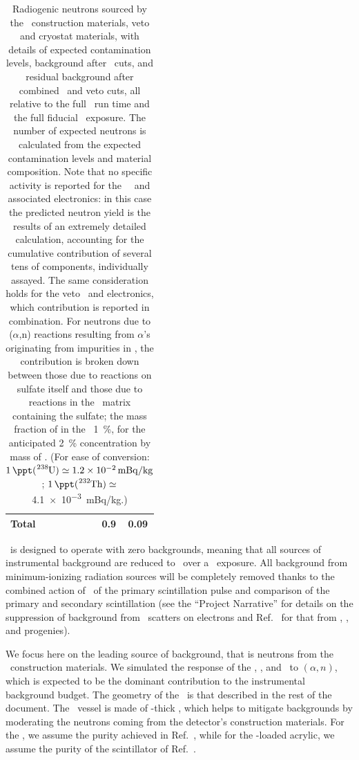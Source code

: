 \begin{table}[t]
\begin{tabular}{lccccccc}
\hline
{\bf Total}								&				&				&				&				&				&\num[math-rm=\mathbf]{0.9}
																																		&\num[math-rm=\mathbf]{0.09}\\ 
\hline
\end{tabular}
\caption[Radiogenic neutrons from detector materials and background before and after cuts.]{Radiogenic neutrons sourced by the \LArTPC\ construction materials, veto and cryostat materials, with details of expected contamination levels, background after \TPC\ cuts, and residual background after combined \TPC\ and veto cuts, all relative to the full \DSkExtendedRunTimePlanned\ run time and the full fiducial \DSkExtendedExposure\ exposure.  The number of expected neutrons is calculated from the expected contamination levels and material composition.  Note that no specific activity is reported for the \TPC\ \SiPMs\ and associated electronics: in this case the predicted neutron yield is the results of an extremely detailed calculation, accounting for the cumulative contribution of several tens of components, individually assayed.  The same consideration holds for the veto \SiPMs\ and electronics, which contribution is reported in combination.  For neutrons due to ($\alpha$,n) reactions resulting from $\alpha$'s originating from impurities in , the contribution is broken down between those due to reactions on  sulfate itself and those due to reactions in the \PMMA\ matrix containing the  sulfate; the mass fraction of  in the \GdAS\ \SI{1}{\percent}, for the anticipated \SI{2}{\percent} concentration by mass of .  (For ease of conversion: $\SI{1}{\ppt}(\ce{^238U}) \simeq \SI{1.2e-2}{mBq/kg}$; $\SI{1}{\ppt}(\ce{^232Th}) \simeq$ \SI{4.1e-3}{mBq/kg}.)}
\label{tab:NeutronBackground}
\end{table}

\DSks\ is designed to operate with zero backgrounds, meaning that all sources of instrumental background are reduced to \BackgroundFreeRequirement\ over a \DSkExtendedExposure\ exposure.  All background from minimum-ionizing radiation sources will be completely removed thanks to the combined action of \PSD\ of the primary scintillation pulse and comparison of the primary and secondary scintillation (see the ``Project Narrative'' for details on the suppression of background from \PP\ scatters on electrons and Ref.~\cite{Aalseth:2018gq} for that from , , and progenies).

We focus here on the leading source of background, that is neutrons from the \LArTPC\ construction materials.  We simulated the response of the \LArTPC, \IAB, and \OAB\ to $(\alpha,n)$, which is expected to be the dominant contribution to the instrumental background budget. The geometry of the \LArTPC\ is that described in the rest of the document.  The \LArTPC\ vessel is made of \DSkPMMATPCThickness-thick \PMMA, which helps to mitigate backgrounds by moderating the neutrons coming from the detector's construction materials.  For the \PMMA, we assume the purity achieved in Ref.~\cite{Nantais:2013jp}, while for the -loaded acrylic, we assume the purity of the scintillator of Ref.~\cite{Barabash:2017cu}.

